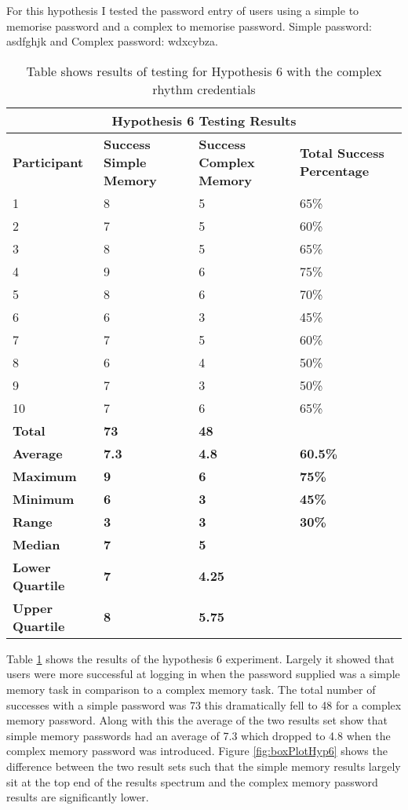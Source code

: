 \documentclass{article}
\begin{document}
For this hypothesis I tested the password entry of users using a simple to memorise password and a complex to memorise password. Simple password: asdfghjk and Complex password: wdxcybza. 


{
\begin{table} [H]
\centering
\begin{tabular}{ |p{2cm}|p{4cm}|p{4cm}| p{4cm} | }
\hline
\multicolumn{4}{|c|}{\textbf{Hypothesis 6 Testing Results}} \\
\hline
\textbf{Participant} & \textbf{Success Simple Memory} & \textbf{Success Complex Memory} & \textbf{Total Success Percentage} \\
\hline
1 & 8 & 5 & 65\% \\
\hline
2 & 7 & 5 & 60\% \\
\hline
3 & 8 & 5 & 65\% \\
\hline
4 & 9 & 6 & 75\%  \\
\hline
5 & 8 & 6 & 70\% \\
\hline
6 & 6 & 3 & 45\% \\
\hline
7 & 7 & 5 & 60\% \\
\hline
8 & 6 & 4 & 50\% \\
\hline
9 & 7 & 3 & 50\% \\
\hline
10 & 7 & 6 & 65\% \\
\hline
\textbf{Total} & \textbf{73} & \textbf{48} & \\
\hline
\textbf{Average} & \textbf{7.3} & \textbf{4.8} & \textbf{60.5\%} \\
\hline
\textbf{Maximum} & \textbf{9} & \textbf{6} & \textbf{75\%} \\
\hline
\textbf{Minimum} & \textbf{6} & \textbf{3} & \textbf{45\%} \\
\hline
\textbf{Range} & \textbf{3} & \textbf{3} & \textbf{30\%} \\
\hline
\textbf{Median} & \textbf{7} & \textbf{5} & \\
\hline
\textbf{Lower Quartile} & \textbf{7} & \textbf{4.25} & \\
\hline
\textbf{Upper Quartile} & \textbf{8} & \textbf{5.75} & \\
\hline
\end{tabular}
\caption{Table shows results of testing for Hypothesis 6 with the complex rhythm credentials}
\label{table:7}
\end{table}
}

Table \ref{table:7} shows the results of the hypothesis 6 experiment. Largely it showed that users were more successful at logging in when the password supplied was a simple memory task in comparison to a complex memory task. The total number of successes with a simple password was 73 this dramatically fell to 48 for a complex memory password. Along with this the average of the two results set show that simple memory passwords had an average of 7.3 which dropped to 4.8 when the complex memory password was introduced. Figure \ref{fig:boxPlotHyp6} shows the difference between the two result sets such that the simple memory results largely sit at the top end of the results spectrum and the complex memory password results are significantly lower. 
\end{document}
